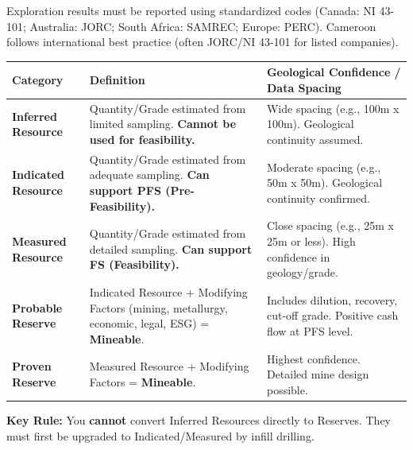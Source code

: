 \documentclass[11pt]{article}
\begin{document}
\begin{definition}
Exploration results must be reported using standardized codes (Canada: NI 43-101; Australia: JORC; South Africa: SAMREC; Europe: PERC). Cameroon follows international best practice (often JORC/NI 43-101 for listed companies).
\begin{center}
\begin{tabularx}{\linewidth}{|l|X|X|}\hline
\rowcolor{popblueL} \textbf{Category} & \textbf{Definition} & \textbf{Geological Confidence / Data Spacing} \\ \hline
\textbf{Inferred Resource} & Quantity/Grade estimated from limited sampling. \textbf{Cannot be used for feasibility.} & Wide spacing (e.g., 100m x 100m). Geological continuity assumed. \\ \hline
\textbf{Indicated Resource} & Quantity/Grade estimated from adequate sampling. \textbf{Can support PFS (Pre-Feasibility).} & Moderate spacing (e.g., 50m x 50m). Geological continuity confirmed. \\ \hline
\textbf{Measured Resource} & Quantity/Grade estimated from detailed sampling. \textbf{Can support FS (Feasibility).} & Close spacing (e.g., 25m x 25m or less). High confidence in geology/grade. \\ \hline
\textbf{Probable Reserve} & Indicated Resource + Modifying Factors (mining, metallurgy, economic, legal, ESG) = \textbf{Mineable}. & Includes dilution, recovery, cut-off grade. Positive cash flow at PFS level. \\ \hline
\textbf{Proven Reserve} & Measured Resource + Modifying Factors = \textbf{Mineable}. & Highest confidence. Detailed mine design possible. \\ \hline
\end{tabularx}
\end{center}
\textbf{Key Rule:} You \textbf{cannot} convert Inferred Resources directly to Reserves. They must first be upgraded to Indicated/Measured by infill drilling.
\end{definition}
\end{document}
